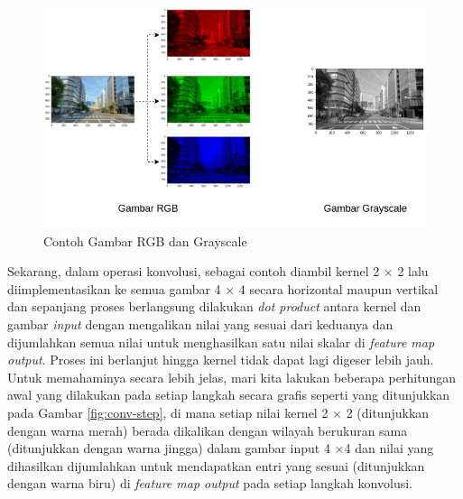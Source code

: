 \begin{figure}[ht]
	\centering
	\includegraphics[scale=0.3]{gambar/rgb-gray-image.png}
	\caption{Contoh Gambar RGB dan Grayscale}
	\label{fig:rgb-gray-image}
\end{figure}

Sekarang, dalam operasi konvolusi, sebagai contoh diambil kernel 2 × 2 lalu diimplementasikan ke semua gambar 4 × 4 secara horizontal maupun vertikal dan sepanjang proses berlangsung dilakukan \textit{dot product} antara kernel dan gambar \textit{input} dengan mengalikan nilai yang sesuai dari keduanya dan dijumlahkan semua nilai untuk menghasilkan satu nilai skalar di \textit{feature map output}. Proses ini berlanjut hingga kernel tidak dapat lagi digeser lebih jauh. Untuk memahaminya secara lebih jelas, mari kita lakukan beberapa perhitungan awal yang dilakukan pada setiap langkah secara grafis seperti yang ditunjukkan pada Gambar \ref{fig:conv-step}, di mana setiap nilai kernel 2 × 2 (ditunjukkan dengan warna merah) berada dikalikan dengan wilayah berukuran sama (ditunjukkan dengan warna jingga) dalam gambar input 4 ×4 dan nilai yang dihasilkan dijumlahkan untuk mendapatkan entri yang sesuai (ditunjukkan dengan warna biru) di \textit{feature map output} pada setiap langkah konvolusi.

